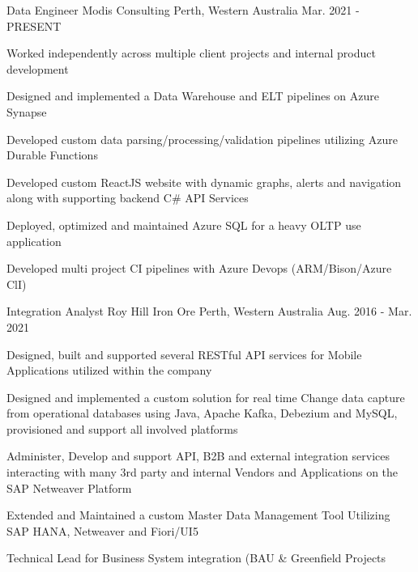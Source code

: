 

\begin{cventries}

  \cventry
    {Data Engineer} %
    {Modis Consulting} %
    {Perth, Western Australia} %
    {Mar. 2021 - PRESENT} %
    {
      \begin{cvitems} %
        \item {Worked independently across multiple client projects and internal product development }
        \item {Designed and implemented a Data Warehouse and ELT pipelines on Azure Synapse}
        \item {Developed custom data parsing/processing/validation pipelines utilizing Azure Durable Functions}
        \item {Developed custom ReactJS website with dynamic graphs, alerts and navigation along with supporting backend C\# API Services}
        \item {Deployed, optimized and maintained Azure SQL for a heavy OLTP use application }
        \item {Developed multi project CI pipelines with Azure Devops (ARM/Bison/Azure ClI)}
      \end{cvitems}
    }

  \cventry
    {Integration Analyst} %
    {Roy Hill Iron Ore} %
    {Perth, Western Australia} %
    {Aug. 2016 - Mar. 2021} %
    {
      \begin{cvitems} %
        \item {Designed,  built and supported several RESTful API services for Mobile Applications utilized within the company}
        \item {Designed and implemented a custom solution for real time Change data capture from operational databases using Java, Apache Kafka, Debezium and MySQL, provisioned and support all involved platforms}
        \item {Administer, Develop and support API, B2B and external integration services interacting with many 3rd party and internal Vendors and Applications on the SAP Netweaver Platform}
        \item {Extended and Maintained a custom Master Data Management Tool Utilizing SAP HANA, Netweaver and Fiori/UI5}
        \item {Technical Lead for Business System integration (BAU \& Greenfield Projects }
      \end{cvitems}
    }


\end{cventries}
